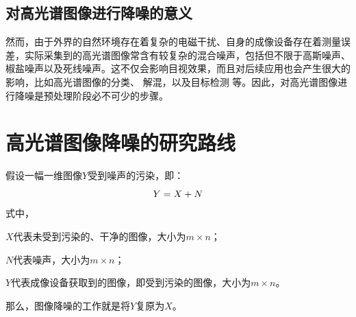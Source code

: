 \documentclass[12pt, a4paper]{article}
\begin{document}
\subsection{对高光谱图像进行降噪的意义}
\par 然而，由于外界的自然环境存在着复杂的电磁干扰、自身的成像设备存在着测量误差，实际采集到的高光谱图像常含有较复杂的混合噪声，包括但不限于高斯噪声、椒盐噪声以及死线噪声。这不仅会影响目视效果，而且对后续应用也会产生很大的影响，比如高光谱图像的分类\cite{further-use-1}、 解混\cite{further-use-2}，以及目标检测\cite{further-use-3} 等。因此，对高光谱图像进行降噪是预处理阶段必不可少的步骤。
\newpage
\section{高光谱图像降噪的研究路线}\label{research-route}
\par 假设一幅一维图像$Y$受到噪声的污染，即：
\begin{equation}
\centering
Y = X + N
\label{ori-equation}
\end{equation}
式中，
\par$X$代表未受到污染的、干净的图像，大小为$m \times n$；
\par$N$代表噪声，大小为$m \times n$；
\par$Y$代表成像设备获取到的图像，即受到污染的图像，大小为$m \times n$。
\par 那么，图像降噪的工作就是将$Y$复原为$X$。
\end{document}

